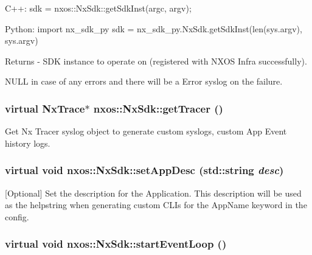 \begin{DoxyCode}
  C++:
       sdk = nxos::NxSdk::getSdkInst(argc, argv);

  Python:
       import nx_sdk_py
       sdk = nx_sdk_py.NxSdk.getSdkInst(len(sys.argv), sys.argv)
\end{DoxyCode}
 \begin{DoxyReturn}{Returns}
-\/ SDK instance to operate on (registered with NXOS Infra successfully).
\begin{DoxyItemize}
\item NULL in case of any errors and there will be a Error syslog on the failure. 
\end{DoxyItemize}
\end{DoxyReturn}
\hypertarget{classnxos_1_1NxSdk_ad2c729bd12d1b9f4bf06f4b70fe28347}{
\subsubsection[{getTracer}]{\setlength{\rightskip}{0pt plus 5cm}virtual {\bf NxTrace}$\ast$ nxos::NxSdk::getTracer ()}}
\label{classnxos_1_1NxSdk_ad2c729bd12d1b9f4bf06f4b70fe28347}
Get Nx Tracer syslog object to generate custom syslogs, custom App Event history logs. \hypertarget{classnxos_1_1NxSdk_a2c6007a383114285951b2d2a062dacec}{
\subsubsection[{setAppDesc}]{\setlength{\rightskip}{0pt plus 5cm}virtual void nxos::NxSdk::setAppDesc (std::string {\em desc})}}
\label{classnxos_1_1NxSdk_a2c6007a383114285951b2d2a062dacec}
\mbox{[}Optional\mbox{]} Set the description for the Application. This description will be used as the helpstring when generating custom CLIs for the AppName keyword in the config. \hypertarget{classnxos_1_1NxSdk_a75ca70643fe325ddf0eea62c1f8c4cc8}{
\subsubsection[{startEventLoop}]{\setlength{\rightskip}{0pt plus 5cm}virtual void nxos::NxSdk::startEventLoop ()}}
